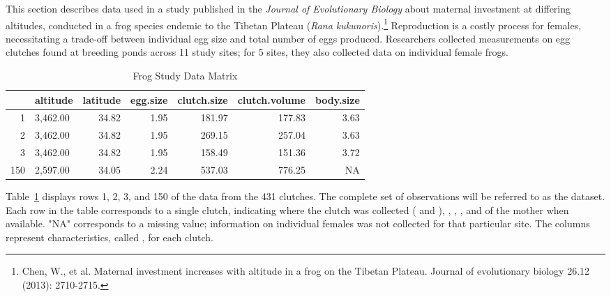 \begin{doublespace}
This section describes data used in a study published in the \textit{Journal of Evolutionary Biology} about maternal investment at differing altitudes, conducted in a frog species endemic to the Tibetan Plateau (\textit{Rana kukunoris}).\footnote{ Chen, W., et al. Maternal investment increases with altitude in a frog on the Tibetan Plateau. Journal of evolutionary biology 26.12 (2013): 2710-2715.} Reproduction is a costly process for females, necessitating a trade-off between individual egg size and total number of eggs produced. Researchers collected measurements on egg clutches found at breeding ponds across 11 study sites; for 5 sites, they also collected data on individual female frogs.

\begin{table}[ht]
\centering
\begin{tabular}{rlrrrrr}
  \hline
 & altitude & latitude & egg.size & clutch.size & clutch.volume & body.size \\ 
  \hline
1 & 3,462.00 & 34.82 & 1.95 & 181.97 & 177.83 & 3.63 \\ 
  2 & 3,462.00 & 34.82 & 1.95 & 269.15 & 257.04 & 3.63 \\ 
  3 & 3,462.00 & 34.82 & 1.95 & 158.49 & 151.36 & 3.72 \\ 
  150 & 2,597.00 & 34.05 & 2.24 & 537.03 & 776.25 & NA \\ 
   \hline
\end{tabular}
\caption{Frog Study Data Matrix} 
\label{frogDF}
\end{table}

Table~\ref{frogDF} displays rows 1, 2, 3, and 150 of the data from the 431 clutches. The complete set of observations will be referred to as the  dataset. Each row in the table corresponds to a single clutch, indicating where the clutch was collected ( and ), , , , and  of the mother when available. "NA" corresponds to a missing value; information on individual females was not collected for that particular site. The columns represent characteristics, called , for each clutch.


\end{doublespace}

